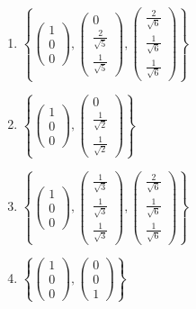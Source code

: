 \documentclass[11pt]{article}
\begin{document}
\begin{enumerate}[label=(\Alph*)]

\item \(\left\{
\begin{pmatrix}1\\0\\0\end{pmatrix},
\begin{pmatrix}0\\\frac{2}{\sqrt{5}}\\\frac{1}{\sqrt{5}}\end{pmatrix},
\begin{pmatrix}\frac{2}{\sqrt{6}}\\\frac{1}{\sqrt{6}}\\\frac{1}{\sqrt{6}}\end{pmatrix}
\right\}\)
\item \(\left\{
\begin{pmatrix}1\\0\\0\end{pmatrix},
\begin{pmatrix}0\\\frac{1}{\sqrt{2}}\\\frac{1}{\sqrt{2}}\end{pmatrix}
\right\}\)
\item \(\left\{
\begin{pmatrix}1\\0\\0\end{pmatrix},
\begin{pmatrix}\frac{1}{\sqrt{3}}\\\frac{1}{\sqrt{3}}\\\frac{1}{\sqrt{3}}\end{pmatrix},
\begin{pmatrix}\frac{2}{\sqrt{6}}\\\frac{1}{\sqrt{6}}\\\frac{1}{\sqrt{6}}\end{pmatrix}
\right\}\)
\item \(\left\{
\begin{pmatrix}1\\0\\0\end{pmatrix},
\begin{pmatrix}0\\0\\1\end{pmatrix}
\right\}\)
\end{enumerate}
\end{document}
